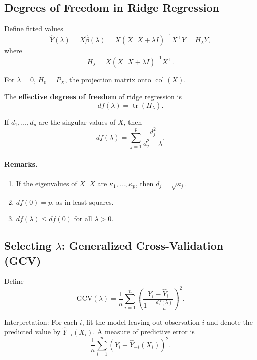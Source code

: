 \subsection{Degrees of Freedom in Ridge Regression}

Define fitted values
\[
    \hat{Y}(\lambda)
    = X \hat{\beta}(\lambda)
    = X (X^{\top} X + \lambda I)^{-1} X^{\top} Y
    = H_{\lambda} Y,
\]
where
\[
    H_{\lambda}
    = X (X^{\top} X + \lambda I)^{-1} X^{\top}.
\]

For $\lambda = 0$, $H_0 = P_X$, the projection matrix onto $\operatorname{col}(X)$.

\begin{definition}
The \textbf{effective degrees of freedom} of ridge regression is
\[
    df(\lambda) = \operatorname{tr}(H_{\lambda}).
\]
\end{definition}

\begin{result}
If $d_1, \dots, d_p$ are the singular values of $X$, then
\[
    df(\lambda)
    = \sum_{j=1}^p \frac{d_j^2}{d_j^2 + \lambda}.
\]
\end{result}

\paragraph{Remarks.}
\begin{enumerate}
    \item If the eigenvalues of $X^{\top} X$ are $\kappa_1, \dots, \kappa_p$, then $d_j = \sqrt{\kappa_j}$.
    \item $df(0) = p$, as in least squares.
    \item $df(\lambda) \le df(0)$ for all $\lambda > 0$.
\end{enumerate}

\subsection{Selecting $\lambda$: Generalized Cross-Validation (GCV)}

Define
\[
    \mathrm{GCV}(\lambda)
    = \frac{1}{n} \sum_{i=1}^n
        \left(
            \frac{Y_i - \hat{Y}_i}{1 - \frac{df(\lambda)}{n}}
        \right)^2.
\]

Interpretation: For each $i$, fit the model leaving out observation $i$
and denote the predicted value by $\hat{Y}_{-i}(X_i)$.  
A measure of predictive error is
\[
    \frac{1}{n} \sum_{i=1}^n (Y_i - \hat{Y}_{-i}(X_i))^2.
\]


